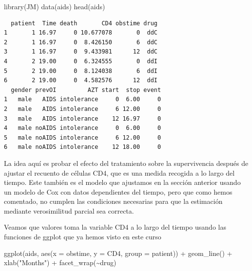 \documentclass[
]{book}
\newenvironment{Shaded}{\begin{snugshade}}{\end{snugshade}}
\newcommand{\AttributeTok}[1]{\textcolor[rgb]{0.77,0.63,0.00}{#1}}
\newcommand{\FunctionTok}[1]{\textcolor[rgb]{0.00,0.00,0.00}{#1}}
\newcommand{\NormalTok}[1]{#1}
\newcommand{\SpecialCharTok}[1]{\textcolor[rgb]{0.00,0.00,0.00}{#1}}
\newcommand{\StringTok}[1]{\textcolor[rgb]{0.31,0.60,0.02}{#1}}
\begin{document}
\begin{Shaded}
\begin{Highlighting}[]
\FunctionTok{library}\NormalTok{(JM)}
\FunctionTok{data}\NormalTok{(aids)}
\FunctionTok{head}\NormalTok{(aids)}
\end{Highlighting}
\end{Shaded}

\begin{verbatim}
  patient  Time death       CD4 obstime drug
1       1 16.97     0 10.677078       0  ddC
2       1 16.97     0  8.426150       6  ddC
3       1 16.97     0  9.433981      12  ddC
4       2 19.00     0  6.324555       0  ddI
5       2 19.00     0  8.124038       6  ddI
6       2 19.00     0  4.582576      12  ddI
  gender prevOI         AZT start  stop event
1   male   AIDS intolerance     0  6.00     0
2   male   AIDS intolerance     6 12.00     0
3   male   AIDS intolerance    12 16.97     0
4   male noAIDS intolerance     0  6.00     0
5   male noAIDS intolerance     6 12.00     0
6   male noAIDS intolerance    12 18.00     0
\end{verbatim}

La idea aquí es probar el efecto del tratamiento sobre la supervivencia después de ajustar el recuento de células CD4, que es una medida recogida a lo largo del tiempo. Este también es el modelo que ajustamos en la sección anterior usando un modelo de Cox con datos dependientes del tiempo, pero que como hemos comentado, no cumplen las condiciones necesarias para que la estimación mediante verosimilitud parcial sea correcta.

Veamos que valores toma la variable CD4 a lo largo del tiempo usando las funciones de ggplot que ya hemos visto en este curso

\begin{Shaded}
\begin{Highlighting}[]
\FunctionTok{ggplot}\NormalTok{(aids, }\FunctionTok{aes}\NormalTok{(}\AttributeTok{x =}\NormalTok{ obstime, }\AttributeTok{y =}\NormalTok{ CD4, }\AttributeTok{group =}\NormalTok{ patient)) }\SpecialCharTok{+}
  \FunctionTok{geom\_line}\NormalTok{() }\SpecialCharTok{+} \FunctionTok{xlab}\NormalTok{(}\StringTok{"Months"}\NormalTok{) }\SpecialCharTok{+} \FunctionTok{facet\_wrap}\NormalTok{(}\SpecialCharTok{\textasciitilde{}}\NormalTok{drug)}
\end{Highlighting}
\end{Shaded}
\end{document}

